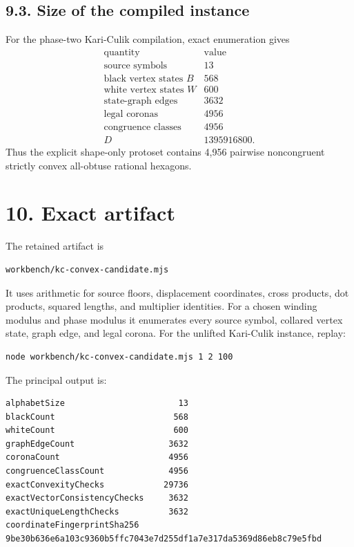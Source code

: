 \documentclass[11pt]{article}
\begin{document}
\subsection*{9.3. Size of the compiled instance}

For the phase-two Kari-Culik compilation, exact enumeration gives
\[
\begin{array}{c|r}
\text{quantity}&\text{value}\\ \hline
\text{source symbols}&13\\
\text{black vertex states }B&568\\
\text{white vertex states }W&600\\
\text{state-graph edges}&3632\\
\text{legal coronas}&4956\\
\text{congruence classes}&4956\\
D&1395916800.
\end{array}
\]
Thus the explicit shape-only protoset contains 4,956 pairwise noncongruent
strictly convex all-obtuse rational hexagons.

\section*{10. Exact artifact}

The retained artifact is

\begin{Verbatim}[fontsize=\small]
workbench/kc-convex-candidate.mjs
\end{Verbatim}

It uses \texttt{} arithmetic for source floors, displacement coordinates,
cross products, dot products, squared lengths, and multiplier identities.
For a chosen winding modulus and phase modulus it enumerates every source
symbol, collared vertex state, graph edge, and legal corona. For the
unlifted Kari-Culik instance, replay:

\begin{Verbatim}[fontsize=\small]
node workbench/kc-convex-candidate.mjs 1 2 100
\end{Verbatim}

The principal output is:

\begin{Verbatim}[fontsize=\small]
alphabetSize                       13
blackCount                        568
whiteCount                        600
graphEdgeCount                   3632
coronaCount                      4956
congruenceClassCount             4956
exactConvexityChecks            29736
exactVectorConsistencyChecks     3632
exactUniqueLengthChecks          3632
coordinateFingerprintSha256
9be30b636e6a103c9360b5ffc7043e7d255df1a7e317da5369d86eb8c79e5fbd
\end{Verbatim}
\end{document}
